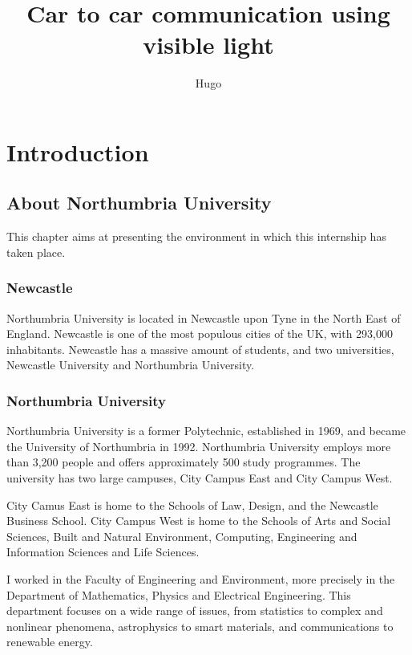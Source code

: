 \documentclass[12pt]{report}
\title{Car to car communication using visible light}
\author{Hugo}
\begin{document}
\maketitle

\tableofcontents








\part{Introduction}

\chapter{About Northumbria University}

This chapter aims at presenting the environment in which this internship has taken place.

\section{Newcastle}

Northumbria University is located in Newcastle upon Tyne in the North East of England. Newcastle is one of the most populous cities of the UK, with 293,000 inhabitants. Newcastle has a massive amount of students, and two universities, Newcastle University and Northumbria University.

\section{Northumbria University}

Northumbria University is a former Polytechnic, established in 1969, and became the University of Northumbria in 1992. Northumbria University employs more than 3,200 people and offers approximately 500 study programmes. The university has two large campuses, City Campus East and City Campus West.

City Camus East is home to the Schools of Law, Design, and the Newcastle Business School. City Campus West is home to the Schools of Arts and Social Sciences, Built and Natural Environment, Computing, Engineering and Information Sciences and Life Sciences.

I worked in the Faculty of Engineering and Environment, more precisely in the Department of Mathematics, Physics and Electrical Engineering. This department focuses on a wide range of issues, from statistics to complex and nonlinear phenomena, astrophysics to smart materials, and communications to renewable energy.
\end{document}
